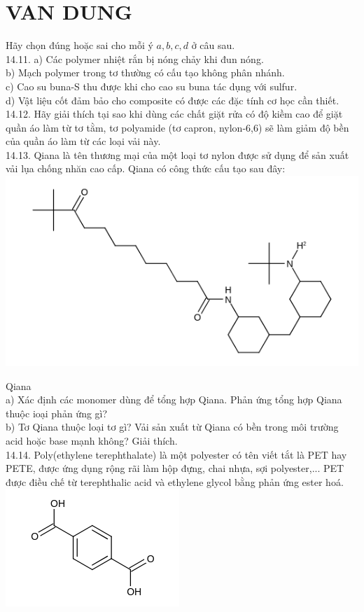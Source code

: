 \documentclass[10pt]{article}
\begin{document}
\section*{VAN DUNG}
Hãy chọn đúng hoặc sai cho mỗi ý $a, b, c, d$ ở câu sau.\\
14.11. a) Các polymer nhiệt rắn bị nóng chảy khi đun nóng.\\
b) Mạch polymer trong tơ thường có cấu tạo không phân nhánh.\\
c) Cao su buna-S thu được khi cho cao su buna tác dụng với sulfur.\\
d) Vật liệu cốt đảm bảo cho composite có được các đặc tính cơ học cần thiết.\\
14.12. Hãy giải thích tại sao khi dùng các chất giặt rửa có độ kiềm cao để giặt quần áo làm từ tơ tằm, tơ polyamide (tơ capron, nylon-6,6) sẽ làm giảm độ bền của quần áo làm từ các loại vải này.\\
14.13. Qiana là tên thương mại của một loại tơ nylon được sử dụng để sản xuất vải lụa chống nhăn cao cấp. Qiana có công thức cấu tạo sau đây:\\
\includegraphics{smile-9130645294707ea727d1c3f6e84a62f199ace142}

Qiana\\
a) Xác định các monomer dùng để tổng hợp Qiana. Phản ứng tổng hợp Qiana thuộc ioại phản ứng gì?\\
b) Tơ Qiana thuộc loại tơ gì? Vải sản xuất từ Qiana có bền trong môi trường acid hoặc base mạnh không? Giải thích.\\
14.14. Poly(ethylene terephthalate) là một polyester có tên viết tắt là PET hay PETE, được ứng dụng rộng rãi làm hộp đựng, chai nhựa, sợi polyester,... PET được điều chế từ terephthalic acid và ethylene glycol bằng phản ứng ester hoá.\\
\includegraphics{smile-671cd0ab02d03e9ed4c1bf3aa0b7df9c0ed0d261}
\end{document}
